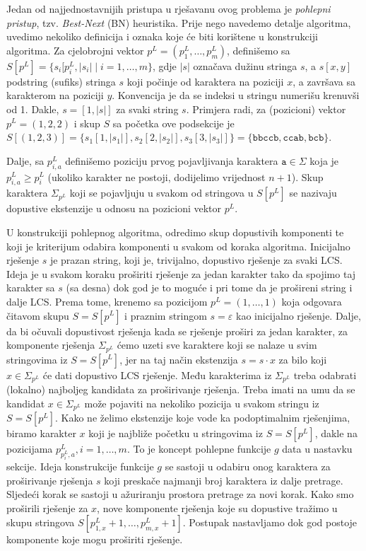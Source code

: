 \documentclass[a4paper, utf8, 11pt, colorlinks]{book}
\begin{document}
Jedan od najjednostavnijih pristupa u rješavanu ovog problema je  \emph{pohlepni pristup}, tzv. \emph{Best-Next} (BN) heuristika. Prije nego navedemo detalje algoritma, uvedimo nekoliko definicija i oznaka koje će biti korištene u konstrukciji algoritma. Za cjelobrojni vektor $p^L = (p^L_1,\ldots, p^L_m)$, definišemo sa
$S[p^L] = \{s_i[p^L_i, |s_i| \mid i=1,\ldots,m\}$, gdje $|s|$ označava dužinu stringa $s$, a $s[x,y]$ podstring (sufiks) stringa $s$ koji počinje od karaktera na poziciji $x$, a završava sa karakterom na poziciji $y$. Konvencija je da se indeksi u stringu numerišu krenuvši od 1. Dakle, $s= [1, |s|]$ za svaki string $s$. Primjera radi, za (pozicioni) vektor $p^L=(1,2,2)$ i skup $S$ sa početka ove podsekcije je $S[ (1,2,3)] = \{ s_1[1, |s_1|], s_2[2, |s_2|], s_3[3, |s_3|]  \}= \{ \texttt{bbccb}, \texttt{ccab}, \texttt{bcb}\}$. 
 
Dalje, sa $p^L_{i,a}$ definišemo poziciju prvog pojavljivanja karaktera $\texttt{a}\in \Sigma$ koja je  $p^L_{i,a} \geq p^L_i$ (ukoliko karakter ne postoji, dodijelimo vrijednost $n+1$). Skup karaktera $\Sigma_{p^L}$ koji se pojavljuju u svakom od stringova u $S[p^L]$ se nazivaju dopustive ekstenzije u odnosu na pozicioni vektor $p^L$. 

U konstrukciji pohlepnog algoritma, odredimo  skup dopustivih komponenti te koji je kriterijum odabira komponenti u svakom od koraka algoritma. Inicijalno rješenje $s$ je prazan string, koji je, trivijalno, dopustivo rješenje za svaki LCS. Ideja je u svakom koraku proširiti rješenje za jedan karakter tako da spojimo taj karakter sa $s$ (sa desna) dok god je to moguće i pri tome da je prošireni string i dalje LCS. Prema tome, krenemo sa pozicijom $p^L = (1, \ldots, 1)$ koja odgovara čitavom skupu $S=S[p^L]$ i praznim stringom $s =\varepsilon$ kao inicijalno rješenje. Dalje, da bi očuvali dopustivost rješenja kada se rješenje proširi za jedan karakter, za komponente rješenja $\Sigma_{p^L}$ ćemo uzeti sve karaktere koji se nalaze u svim stringovima iz $S=S[p^L]$, jer na taj način  ekstenzija $s = s \cdot x$ za bilo koji $x \in \Sigma_{p^L}$ će dati dopustivo LCS rješenje. Među karakterima iz $\Sigma_{p^L}$ treba odabrati (lokalno) najboljeg kandidata za proširivanje rješenja. Treba imati na umu da se kandidat $x\in \Sigma_{p^L}$ može pojaviti na nekoliko pozicija u svakom stringu iz $S=S[p^L]$. Kako ne želimo ekstenzije koje vode ka podoptimalnim rješenjima, biramo karakter $x$ koji je najbliže početku u stringovima iz $S=S[p^L]$, dakle na pozicijama $p^L_{p^L_{i},a},i=1,\ldots,m$. 
To je koncept pohlepne funkcije $g$ data u nastavku sekcije. Ideja konstrukcije funkcije $g$ se sastoji u odabiru onog karaktera za proširivanje rješenja $s$ koji preskače najmanji broj karaktera iz dalje pretrage. Sljedeći korak se sastoji u ažuriranju prostora pretrage za novi korak. Kako smo proširili rješenje za $x$, nove komponente rješenja koje su dopustive tražimo u skupu stringova $S[p^L_{1,x}+1,\ldots, p^L_{m, x}+1]$. Postupak nastavljamo dok god postoje komponente koje mogu proširiti rješenje. 
\end{document}
